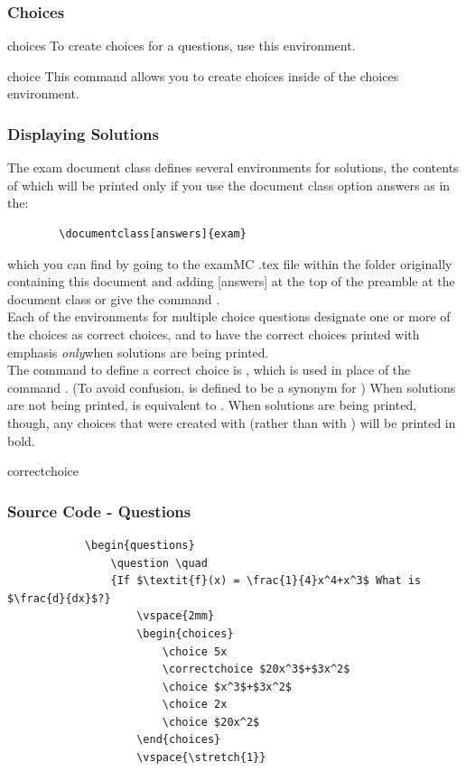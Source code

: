 \documentclass[12pt,hidelinks]{article}
\begin{document}
		\subsubsection{Choices}
			\begin{docEnvironment}{choices}{}
				To create choices for a questions, use this environment. 
			\end{docEnvironment}
			\begin{docCommand}{choice}{}
				This command allows you to create choices inside of the choices environment.
			\end{docCommand}
	\subsubsection{Displaying Solutions}
		The exam document class defines several environments for solutions, the contents of which will be printed only if you use the document class option answers as in the:\\ \begin{verbatim} 
		\documentclass[answers]{exam}
		\end{verbatim}
		which you can find by going to the examMC .tex file within the folder originally containing this document and adding [answers] at the top of the preamble at the document class or give the command .\\ \vspace{1.5mm}
		Each of the environments for multiple choice questions
		designate one or more of the choices as correct choices, and to have the correct choices printed with emphasis \emph{only}when solutions are being printed.\vspace{1.5mm}\\ 
		The command to define a correct choice is , which is used in place of the command . (To avoid confusion,  is defined to be a synonym
		for ) When solutions are not being printed,  is equivalent to . When solutions are being printed, though, any choices that were created with
		 (rather than with ) will be printed in bold.
			\begin{docCommand}{correctchoice}{}
			\end{docCommand}
		\subsubsection{Source Code - Questions}
			\begin{verbatim}
			\begin{questions}
				\question \quad
				{If $\textit{f}(x) = \frac{1}{4}x^4+x^3$ What is $\frac{d}{dx}$?}
					\vspace{2mm}
					\begin{choices}
						\choice 5x
						\correctchoice $20x^3$+$3x^2$
						\choice $x^3$+$3x^2$
						\choice 2x
						\choice $20x^2$
					\end{choices}
					\vspace{\stretch{1}}
			\end{verbatim}
\end{document}

